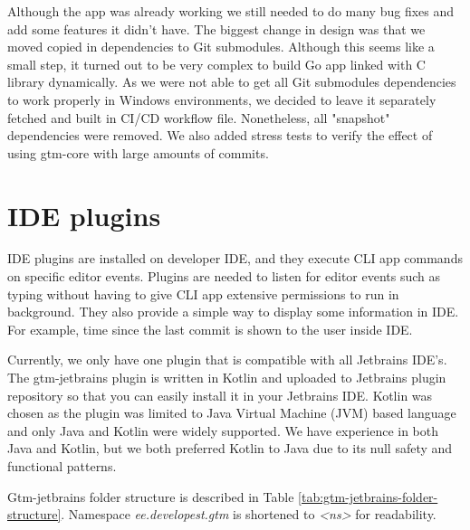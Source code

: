 Although the app was already working we still needed to do many bug fixes and add some features it didn't have.
The biggest change in design was that we moved copied in dependencies to Git submodules.
Although this seems like a small step, it turned out to be very complex to build Go app linked with C library dynamically.
As we were not able to get all Git submodules dependencies to work properly in Windows environments,
we decided to leave it separately fetched and built in CI/CD workflow file.
Nonetheless, all "snapshot" dependencies were removed.
We also added stress tests to verify the effect of using gtm-core with large amounts of commits.

\section{IDE plugins}\label{sec:ide-plugins}
IDE plugins are installed on developer IDE, and they execute CLI app commands on specific editor events.
Plugins are needed to listen for editor events such as typing without having to give CLI app extensive permissions to run in background.
They also provide a simple way to display some information in IDE.
For example, time since the last commit is shown to the user inside IDE.

Currently, we only have one plugin that is compatible with all Jetbrains IDE's.
The gtm-jetbrains plugin is written in Kotlin and uploaded to Jetbrains plugin repository so that you can easily install it in your Jetbrains IDE.
Kotlin was chosen as the plugin was limited to Java Virtual Machine (JVM) based language and only Java and Kotlin were widely supported.
We have experience in both Java and Kotlin, but we both preferred Kotlin to Java due to its null safety and functional patterns.

Gtm-jetbrains folder structure is described in Table
\ref{tab:gtm-jetbrains-folder-structure}.
Namespace \textit{ee.developest.gtm} is shortened to \textit{<ns>} for readability.

